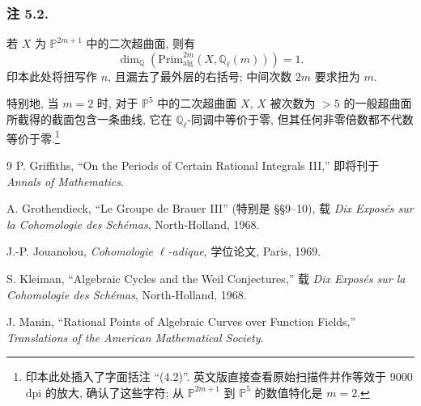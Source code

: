 \subsubsection*{注 5.2.}
若 $X$ 为 $\mathbb P^{2m+1}$ 中的二次超曲面, 则有
\begin{equation*}
\dim_{\mathbb Q}\!\left(
  \mathrm{Prim}^{2m}_{\mathrm{alg}}(X,\mathbb Q_\ell(m))
\right)=1.
\end{equation*}
印本此处将扭写作 $n$, 且漏去了最外层的右括号; 中间次数 $2m$ 要求扭为 $m$.

特别地, 当 $m=2$ 时, 对于 $\mathbb P^5$ 中的二次超曲面 $X$, $X$ 被次数为 $>5$ 的一般超曲面所截得的截面包含一条曲线, 它在 $\mathbb Q_\ell$-同调中等价于零, 但其任何非零倍数都不代数等价于零.\footnote{印本此处插入了字面括注 ``(4.2)''. 英文版直接查看原始扫描件并作等效于 9000 dpi 的放大, 确认了这些字符; 从 $\mathbb P^{2m+1}$ 到 $\mathbb P^5$ 的数值特化是 $m=2$.}

\begin{thebibliography}{9}
P. Griffiths, ``On the Periods of Certain Rational Integrals III,''
即将刊于 \emph{Annals of Mathematics}.

A. Grothendieck, ``Le Groupe de Brauer III'' (特别是 \S\S 9--10), 载
\emph{Dix Exposés sur la Cohomologie des Schémas}, North-Holland, 1968.

J.-P. Jouanolou, \emph{Cohomologie $\ell$-adique}, 学位论文, Paris, 1969.

S. Kleiman, ``Algebraic Cycles and the Weil Conjectures,'' 载
\emph{Dix Exposés sur la Cohomologie des Schémas}, North-Holland, 1968.

J. Manin, ``Rational Points of Algebraic Curves over Function Fields,''
\emph{Translations of the American Mathematical Society}.
\end{thebibliography}
